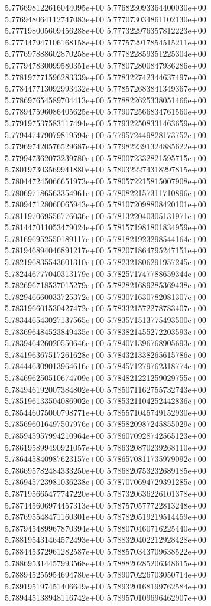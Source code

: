 5.776698122616044095e+00
5.776823093364400030e+00
5.776948064112747083e+00
5.777073034861102130e+00
5.777198005609456288e+00
5.777322976357812223e+00
5.777447947106168158e+00
5.777572917854515211e+00
5.777697888602870258e+00
5.777822859351225304e+00
5.777947830099580351e+00
5.778072800847936286e+00
5.778197771596283339e+00
5.778322742344637497e+00
5.778447713092993432e+00
5.778572683841349367e+00
5.778697654589704413e+00
5.778822625338051466e+00
5.778947596086405625e+00
5.779072566834761560e+00
5.779197537583117494e+00
5.779322508331463659e+00
5.779447479079819594e+00
5.779572449828173752e+00
5.779697420576529687e+00
5.779822391324885622e+00
5.779947362073239780e+00
5.780072332821595715e+00
5.780197303569941880e+00
5.780322274318297815e+00
5.780447245066651973e+00
5.780572215815007908e+00
5.780697186563354961e+00
5.780822157311710896e+00
5.780947128060065943e+00
5.781072098808420101e+00
5.781197069556776036e+00
5.781322040305131971e+00
5.781447011053479024e+00
5.781571981801834959e+00
5.781696952550189117e+00
5.781821923298544164e+00
5.781946894046891217e+00
5.782071864795247151e+00
5.782196835543601310e+00
5.782321806291957245e+00
5.782446777040313179e+00
5.782571747788659344e+00
5.782696718537015279e+00
5.782821689285369438e+00
5.782946660033725372e+00
5.783071630782081307e+00
5.783196601530427472e+00
5.783321572278783407e+00
5.783446543027137565e+00
5.783571513775493500e+00
5.783696484523849435e+00
5.783821455272203593e+00
5.783946426020550646e+00
5.784071396768905693e+00
5.784196367517261628e+00
5.784321338265615786e+00
5.784446309013964616e+00
5.784571279762318774e+00
5.784696250510674709e+00
5.784821221259029755e+00
5.784946192007384802e+00
5.785071162755732743e+00
5.785196133504086902e+00
5.785321104252442836e+00
5.785446075000798771e+00
5.785571045749152930e+00
5.785696016497507976e+00
5.785820987245855029e+00
5.785945957994210964e+00
5.786070928742565123e+00
5.786195899490921057e+00
5.786320870239268110e+00
5.786445840987623157e+00
5.786570811735979092e+00
5.786695782484333250e+00
5.786820753232689185e+00
5.786945723981036238e+00
5.787070694729391285e+00
5.787195665477747220e+00
5.787320636226101378e+00
5.787445606974457313e+00
5.787570577722813248e+00
5.787695548471160301e+00
5.787820519219514459e+00
5.787945489967870394e+00
5.788070460716225440e+00
5.788195431464572493e+00
5.788320402212928428e+00
5.788445372961282587e+00
5.788570343709638522e+00
5.788695314457993568e+00
5.788820285206348615e+00
5.788945255954694780e+00
5.789070226703050714e+00
5.789195197451406649e+00
5.789320168199762584e+00
5.789445138948116742e+00
5.789570109696462907e+00
